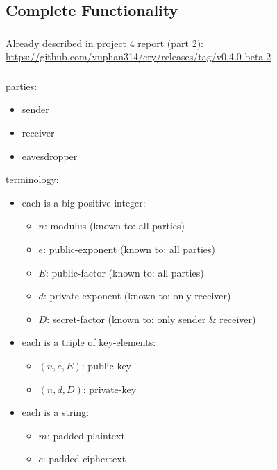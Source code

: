 \subsection{Complete Functionality}


\subsubsection{\rsa{} \cs}

Already described in project 4 report (part 2):
\url{https://github.com/vuphan314/cry/releases/tag/v0.4.0-beta.2}


\subsubsection{\dummy{} \cs}

parties:
\begin{itemize}
\item sender
\item receiver
\item eavesdropper
\end{itemize}

terminology:
\begin{itemize}
\item each  is a big positive integer:
  \begin{itemize}
  \item $n$: modulus (known to: all parties)
  \item $e$: public-exponent (known to: all parties)
  \item $E$: public-factor (known to: all parties)
  \item $d$: private-exponent (known to: only receiver)
  \item $D$: secret-factor
    (known to: only sender \& receiver)
  \end{itemize}
\item each  is a triple of key-elements:
  \begin{itemize}
  \item $(n, e, E)$: public-key
  \item $(n, d, D)$: private-key
  \end{itemize}
\item each  is a string:
  \begin{itemize}
  \item $m$: padded-plaintext
  \item $c$: padded-ciphertext
  \end{itemize}
\end{itemize}

